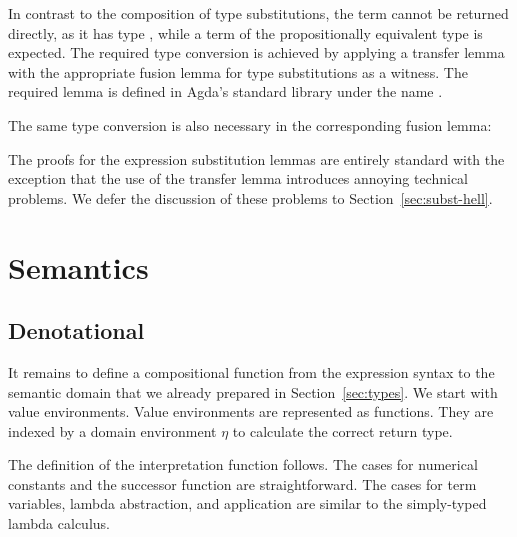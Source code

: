 \documentclass[sigplan,anonymous,review,screen]{acmart}
\begin{document}
In contrast to the composition of type substitutions, the term
 cannot be returned directly,
as it has type ,
while a term of the propositionally equivalent type
 is expected.
The required type conversion is achieved by applying a transfer lemma
with the appropriate fusion lemma for type substitutions as a witness. 
The required lemma is defined in Agda's standard library under the
name {\Asubst}.
\SubstExamplesDef

The same type conversion is also necessary in the corresponding fusion lemma:
\SubstExamplesFusionESubESub

The proofs for the expression substitution lemmas are entirely standard with the
exception that the use of the transfer lemma introduces annoying technical problems.
We defer the discussion of these problems to Section~\ref{sec:subst-hell}.


\section{Semantics}
\label{sec:semantics}

\subsection{Denotational}
\label{sec:denotational}



It remains to define a compositional function from the expression
syntax to the semantic domain that we already prepared in
Section~\ref{sec:types}. We start with value environments.
\TFVEnv
Value environments are represented as functions. They are indexed by a
domain environment $\eta$ to calculate the correct return type.

The definition of the interpretation function follows.
\TFExprSem
The cases for numerical constants and the successor function are straightforward.
The cases for term variables, lambda abstraction, and application are
similar to the  simply-typed lambda calculus.
\end{document}
